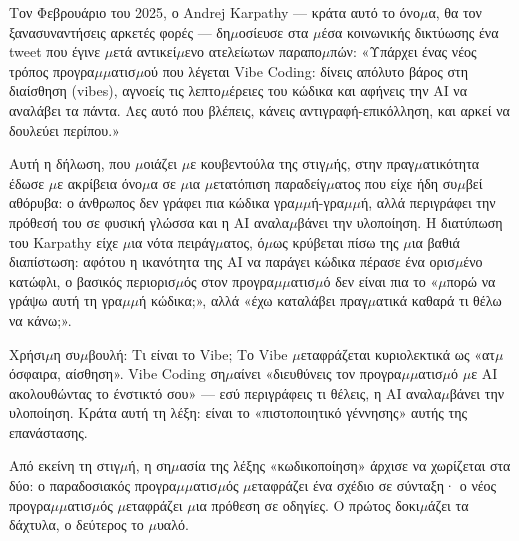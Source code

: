 


Τον Φεβρουάριο του 2025, ο Andrej Karpathy — κράτα αυτό το όνο$\mu$α, θα τον ξανασυναντήσεις αρκετές φορές — δη$\mu$οσίευσε στα $\mu$έσα κοινωνικής δικτύωσης ένα tweet που έγινε $\mu$ετά αντικεί$\mu$ενο ατελείωτων παραπο$\mu$πών: «Υπάρχει ένας νέος τρόπος προγρα$\mu$$\mu$ατισ$\mu$ού που λέγεται Vibe Coding: δίνεις απόλυτο βάρος στη διαίσθηση (vibes), αγνοείς τις λεπτο$\mu$έρειες του κώδικα και αφήνεις την AI να αναλάβει τα πάντα. Λες αυτό που βλέπεις, κάνεις αντιγραφή-επικόλληση, και αρκεί να δουλεύει περίπου.»

Αυτή η δήλωση, που $\mu$οιάζει $\mu$ε κουβεντούλα της στιγ$\mu$ής, στην πραγ$\mu$ατικότητα έδωσε $\mu$ε ακρίβεια όνο$\mu$α σε $\mu$ια $\mu$ετατόπιση παραδείγ$\mu$ατος που είχε ήδη συ$\mu$βεί αθόρυβα: ο άνθρωπος δεν γράφει πια κώδικα γρα$\mu$$\mu$ή-γρα$\mu$$\mu$ή, αλλά περιγράφει την πρόθεσή του σε φυσική γλώσσα και η AI αναλα$\mu$βάνει την υλοποίηση. Η διατύπωση του Karpathy είχε $\mu$ια νότα πειράγ$\mu$ατος, ό$\mu$ως κρύβεται πίσω της $\mu$ια βαθιά διαπίστωση: αφότου η ικανότητα της AI να παράγει κώδικα πέρασε ένα ορισ$\mu$ένο κατώφλι, ο βασικός περιορισ$\mu$ός στον προγρα$\mu$$\mu$ατισ$\mu$ό δεν είναι πια το «$\mu$πορώ να γράψω αυτή τη γρα$\mu$$\mu$ή κώδικα;», αλλά «έχω καταλάβει πραγ$\mu$ατικά καθαρά τι θέλω να κάνω;».

\begin{tcbinfo}{Χρήσι$\mu$η συ$\mu$βουλή: Τι είναι το Vibe;}
Το Vibe $\mu$εταφράζεται κυριολεκτικά ως «ατ$\mu$όσφαιρα, αίσθηση». Vibe Coding ση$\mu$αίνει «διευθύνεις τον προγρα$\mu$$\mu$ατισ$\mu$ό $\mu$ε AI ακολουθώντας το ένστικτό σου» — εσύ περιγράφεις τι θέλεις, η AI αναλα$\mu$βάνει την υλοποίηση. Κράτα αυτή τη λέξη: είναι το «πιστοποιητικό γέννησης» αυτής της επανάστασης.

\end{tcbinfo}

Από εκείνη τη στιγ$\mu$ή, η ση$\mu$ασία της λέξης «κωδικοποίηση» άρχισε να χωρίζεται στα δύο: ο παραδοσιακός προγρα$\mu$$\mu$ατισ$\mu$ός $\mu$εταφράζει ένα σχέδιο σε σύνταξη· ο νέος προγρα$\mu$$\mu$ατισ$\mu$ός $\mu$εταφράζει $\mu$ια πρόθεση σε οδηγίες. Ο πρώτος δοκι$\mu$άζει τα δάχτυλα, ο δεύτερος το $\mu$υαλό.


